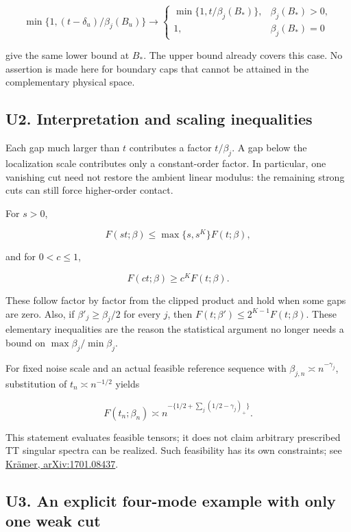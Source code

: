 \documentclass[
  11pt,
]{article}
\begin{document}
\[\min\{1,(t-\delta_u)/\beta_j(B_u)\}\longrightarrow
\begin{cases}\min\{1,t/\beta_j(B_*)\},&\beta_j(B_*)>0,\\1,&\beta_j(B_*)=0\end{cases}\]

give the same lower bound at \(B_*\). The upper bound already covers
this case. No assertion is made here for boundary caps that cannot be
attained in the complementary physical space.

\subsection{U2. Interpretation and scaling
inequalities}\label{u2.-interpretation-and-scaling-inequalities}

Each gap much larger than \(t\) contributes a factor \(t/\beta_j\). A
gap below the localization scale contributes only a constant-order
factor. In particular, one vanishing cut need not restore the ambient
linear modulus: the remaining strong cuts can still force higher-order
contact.

For \(s>0\),

\[F(st;\beta)\le\max\{s,s^K\}F(t;\beta),\]

and for \(0<c\le1\),

\[F(ct;\beta)\ge c^K F(t;\beta).\tag{U2}\]

These follow factor by factor from the clipped product and hold when
some gaps are zero. Also, if \(\beta'_j\ge\beta_j/2\) for every \(j\),
then \(F(t;\beta')\le2^{K-1}F(t;\beta)\). These elementary inequalities
are the reason the statistical argument no longer needs a bound on
\(\max\beta_j/\min\beta_j\).

For fixed noise scale and an actual feasible reference sequence with
\(\beta_{j,n}\asymp n^{-\gamma_j}\), substitution of
\(t_n\asymp n^{-1/2}\) yields

\[F(t_n;\beta_n)\asymp
n^{-\{1/2+\sum_j(1/2-\gamma_j)_+\}}.\]

This statement evaluates feasible tensors; it does not claim arbitrary
prescribed TT singular spectra can be realized. Such feasibility has its
own constraints; see \href{https://arxiv.org/abs/1701.08437}{Krämer,
arXiv:1701.08437}.

\subsection{U3. An explicit four-mode example with only one weak
cut}\label{u3.-an-explicit-four-mode-example-with-only-one-weak-cut}
\end{document}
